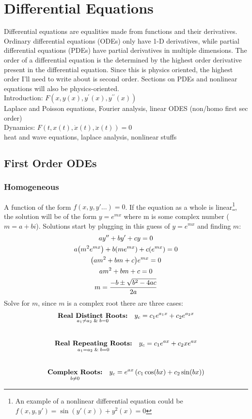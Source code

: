 \documentclass{article}
\begin{document}
\section{Differential Equations} 

Differential equations are equalities made from functions and their derivatives. Ordinary differential equations (ODEs) only have 1-D derivatives, while partial differential equations (PDEs) have partial derivatives in multiple dimensions. The order of a differential equation is the determined by the highest order derivative present in the differential equation. Since this is physics oriented, the highest order I'll need to write about is second order. Sections on PDEs and nonlinear equations will also be physics-oriented.
\\
Introduction: $F
(x,y(x),y^\prime(x),y^{\prime\prime}(x))$\\
Laplace and Poisson equations, Fourier analysis, linear ODES (non/homo first sec order)\\
Dynamics: $F(t,x(t),\dot{x}(t),\ddot{x}(t))=0$\\
heat and wave equations, laplace analysis, nonlinear stuffs  
\par

\subsection{First Order ODEs}
    \subsubsection{Homogeneous}
        A function of the form $f(x,y,y'...)=0$. If the equation as a whole is linear\footnote{An example of a nonlinear differential equation could be $f(x,y,y')=\sin(y'(x))+y^2(x)=0$}, 
        the solution will be of the form \(y=e^{mx}\) where m is some complex number ($m=a+bi$). Solutions start by plugging in this guess of $y=e^{mx}$ and finding $m$:
        {
        \length[0.25 cm]
        \begin{gather*}
            ay''+by'+cy=0 
            \\
            a\qty(m^2e^{m x})+b \qty(m e^{m x})+c \qty(e^{m x})=0
            \\
            \qty(am^2+b m+c)e^{mx}=0
            \\
            am^2+b m+c=0
            \\
            m=\frac{-b\pm\sqrt{b^2-4ac}}{2a}
        \end{gather*}
        }
        Solve for $m$, since $m$ is a complex root there are three cases:
        \begin{gather}
            \underset { a_1 \neq a_2\And b=0 }{\textbf{Real Distinct Roots:}}\quad y_c=c_1e^{a_1x}+c_2e^{a_2x}\\[0.7 cm]
            \underset{a_1=a_2 \And b=0 }{\textbf{Real Repeating Roots:}}\quad y_c=c_1e^{ax}+c_2xe^{ax}\\[0.7 cm]
            \underset{b \neq 0}{\textbf{Complex Roots:}}\quad y_c=e^{ax}\left(c_1\cos(bx)+c_2\sin(bx)\right)
        \end{gather}
\end{document}

